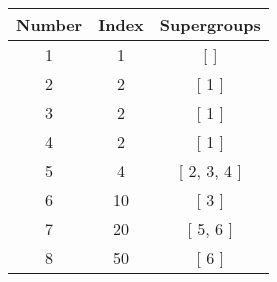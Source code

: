 \begin{center}
\begin{longtable}[H]{|| c c c ||}
\hline
Number & Index & Supergroups \\ 
\hline
1 & 1 & [ ] \\ 
\hline
2 & 2 & [ 1 ] \\ 
\hline
3 & 2 & [ 1 ] \\ 
\hline
4 & 2 & [ 1 ] \\ 
\hline
5 & 4 & [ 2, 3, 4 ] \\ 
\hline
6 & 10 & [ 3 ] \\ 
\hline
7 & 20 & [ 5, 6 ] \\ 
\hline
8 & 50 & [ 6 ] \\ 
\hline
\end{longtable}
\end{center}
